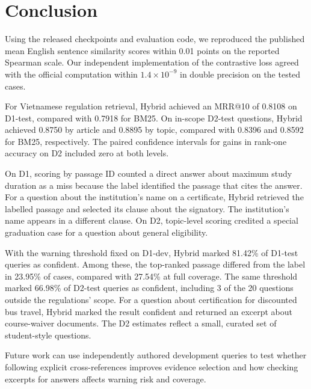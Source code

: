 \section{Conclusion}
\label{sec:conclusion}

Using the released checkpoints and evaluation code, we reproduced the
published mean English sentence similarity scores within 0.01 points
on the reported Spearman scale.
Our independent implementation of the contrastive loss agreed with the
official computation within $1.4\times10^{-9}$ in double precision on
the tested cases.

For Vietnamese regulation retrieval, Hybrid achieved an MRR@10 of 0.8108
on D1-test, compared with 0.7918 for BM25.
On in-scope D2-test questions, Hybrid achieved 0.8750 by article and
0.8895 by topic, compared with 0.8396 and 0.8592 for BM25, respectively.
The paired confidence intervals for gains in rank-one accuracy on D2
included zero at both levels.

On D1, scoring by passage ID counted a direct answer about maximum study
duration as a miss because the label identified the passage that cites
the answer. For a question about the institution's name on a certificate,
Hybrid retrieved the labelled passage and selected its clause about the
signatory. The institution's name appears in a different clause.
On D2, topic-level scoring credited a special graduation case for a
question about general eligibility.

With the warning threshold fixed on D1-dev, Hybrid marked 81.42\% of
D1-test queries as confident. Among these, the top-ranked passage differed
from the label in 23.95\% of cases, compared with 27.54\% at full coverage.
The same threshold marked 66.98\% of D2-test queries as confident,
including 3 of the 20 questions outside the regulations' scope.
For a question about certification for discounted bus travel, Hybrid
marked the result confident and returned an excerpt about course-waiver
documents. The D2 estimates reflect a small, curated set of student-style
questions.

Future work can use independently authored development queries to test whether
following explicit cross-references improves evidence selection and how
checking excerpts for answers affects warning risk and coverage.
